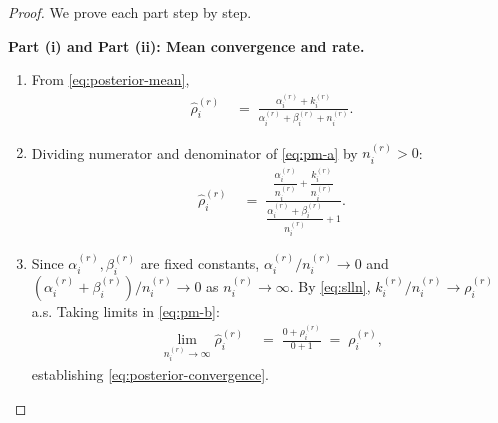 \documentclass[12pt,openany]{book}
\numberwithin{equation}{chapter}
\theoremstyle{plain}
\theoremstyle{definition}
\theoremstyle{remark}
\numberwithin{equation}{chapter}
\theoremstyle{plain}
\begin{document}
\begin{proof}
We prove each part step by step.

\medskip
\noindent\textbf{Part (i) and Part (ii): Mean convergence and rate.}

\begin{enumerate}
  \item[\textup{(a)}] From \eqref{eq:posterior-mean},
        \begin{align}
          \hat{\rho}_i^{(r)}
          &\;=\;
          \frac{\alpha_i^{(r)} + k_i^{(r)}}
               {\alpha_i^{(r)} + \beta_i^{(r)} + n_i^{(r)}}.
          \label{eq:pm-a}
        \end{align}

  \item[\textup{(b)}] Dividing numerator and denominator
        of \eqref{eq:pm-a} by $n_i^{(r)} > 0$:
        \begin{align}
          \hat{\rho}_i^{(r)}
          &\;=\;
          \frac{
            \dfrac{\alpha_i^{(r)}}{n_i^{(r)}}
            + \dfrac{k_i^{(r)}}{n_i^{(r)}}
          }{
            \dfrac{\alpha_i^{(r)} + \beta_i^{(r)}}{n_i^{(r)}}
            + 1
          }.
          \label{eq:pm-b}
        \end{align}

  \item[\textup{(c)}] Since $\alpha_i^{(r)}, \beta_i^{(r)}$
        are fixed constants,
        $\alpha_i^{(r)}/n_i^{(r)} \to 0$ and
        $(\alpha_i^{(r)}+\beta_i^{(r)})/n_i^{(r)} \to 0$
        as $n_i^{(r)} \to \infty$.
        By \eqref{eq:slln}, $k_i^{(r)}/n_i^{(r)} \to
        \rho_i^{(r)}$ a.s.  Taking limits in
        \eqref{eq:pm-b}:
        \begin{align}
          \lim_{n_i^{(r)}\to\infty} \hat{\rho}_i^{(r)}
          &\;=\;
          \frac{0 + \rho_i^{(r)}}{0 + 1}
          \;=\; \rho_i^{(r)},
          \label{eq:pm-c}
        \end{align}
        establishing \eqref{eq:posterior-convergence}.


\end{enumerate}
\end{proof}
\end{document}
